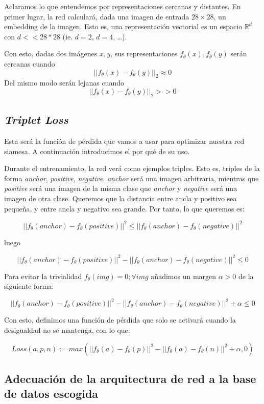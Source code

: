 \documentclass[11pt]{article}
\begin{document}
Aclaramos lo que entendemos por representaciones cercanas y distantes. En primer lugar, la red calculará, dada una imagen de entrada $28\times28$, un embedding de la imagen. Esto es, una representación vectorial es un espacio $\mathbb{R}^d$ con $d << 28*28$ (ie. $d = 2$, $d = 4$, \ldots). 

Con esto, dadas dos imágenes $x, y$, sus representaciones $ f_{\theta}(x),  f_{\theta}(y)$ serán cercanas cuando $$|| f_{\theta}(x) - f_{\theta}(y)||_2 \approx 0$$ Del mismo modo serán lejanas cuando $$|| f_{\theta}(x) - f_{\theta}(y)||_2 >> 0$$ 

\pagebreak
\subsection{\emph{Triplet Loss}}

Esta será la función de pérdida que vamos a usar para optimizar nuestra red siamesa. A continuación introducimos el por qué de su uso.

Durante el entrenamiento, la red verá como ejemplos triples. Esto es, triples de la forma \emph{anchor}, \emph{positive}, \emph{negative}. \emph{anchor} será una imagen arbitraria, mientras que \emph{positive} será una imagen de la misma clase que \emph{anchor} y \emph{negative} será una imagen de otra clase. Queremos que la distancia entre ancla y positivo sea pequeña, y entre ancla y negativo sea grande. Por tanto, lo que queremos es:

$$||f_{\theta}(anchor) - f_{\theta}(positive)||^2 \leq ||f_{\theta}(anchor) - f_{\theta}(negative)||^2 $$

luego 

$$||f_{\theta}(anchor) - f_{\theta}(positive)||^2 - ||f_{\theta}(anchor) - f_{\theta}(negative)||^2 \leq 0$$

Para evitar la trivialidad $f_{\theta}(img) = 0; \forall img$ añadimos un margen $\alpha > 0$ de la siguiente forma:

$$||f_{\theta}(anchor) - f_{\theta}(positive)||^2 - ||f_{\theta}(anchor) - f_{\theta}(negative)||^2 + \alpha \leq 0$$

Con esto, definimos una función de pérdida que solo se activará cuando la desigualdad no se mantenga, con lo que:

$$Loss(a, p, n) := max(||f_{\theta}(a) - f_{\theta}(p)||^2 - ||f_{\theta}(a) - f_{\theta}(n)||^2 + \alpha, 0)$$

\pagebreak
\subsection{Adecuación de la arquitectura de red a la base de datos escogida} \label{adecuacion_arquitectura_red:seccion}
\end{document}
